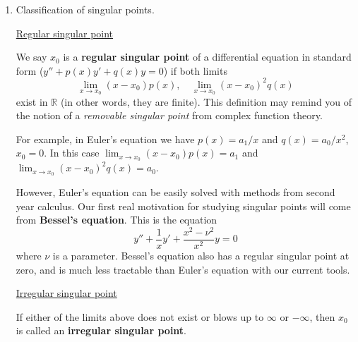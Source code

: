 \documentclass[11pt, letterpaper, oneside]{article}     %
\numberwithin{equation}{subsection}
\theoremstyle{definition}
\numberwithin{theorem}{section}
\theoremstyle{remark}
\newcommand{\RR}{\mathbb{R}}
\begin{document}
\begin{enumerate}
  By dividing by $a_2x^2$, we can assume without loss of generality that we are dealing with the equation
  \begin{equation}
    \frac{d^2y}{dx^2} + \frac{a_1}{x}\frac{dy}{dx} + \frac{a_0}{x^2}y = 0
  \end{equation}
  in standard form (both equations have the same solutions).

\item Classification of singular points.

  \underline{Regular singular point}

  We say $x_0$ is a \textbf{regular singular point} of a differential equation in standard form ($y'' + p(x)y' + q(x)y = 0$) if both limits
  \begin{equation}
    \lim_{x\to x_0}(x-x_0)p(x), \quad \lim_{x\to x_0}(x-x_0)^2q(x)
  \end{equation}
  exist in $\RR$ (in other words, they are finite). This definition may remind you of the notion of a \emph{removable singular point} from complex function theory.

  For example, in Euler's equation we have $p(x) = a_1/x$ and $q(x) = a_0/x^2$, $x_0  = 0$. In this case $\lim_{x\to x_0}(x-x_0)p(x) = a_1$ and $\lim_{x\to x_0}(x-x_0)^2q(x) = a_0$.

  However, Euler's equation can be easily solved with methods from second year calculus. Our first real motivation for studying singular points will come from \textbf{Bessel's equation}. This is the equation
  \begin{equation}
    y'' + \frac{1}{x}y' + \frac{x^2-\nu^2}{x^2}y = 0
  \end{equation}
  where $\nu$ is a parameter. Bessel's equation also has a regular singular point at zero, and is much less tractable than Euler's equation with our current tools.

  \medskip

  \underline{Irregular singular point}

  If either of the limits above does not exist or blows up to $\infty$ or $-\infty$, then $x_0$ is called an \textbf{irregular singular point}.

  \medskip


\end{enumerate}
\end{document}
